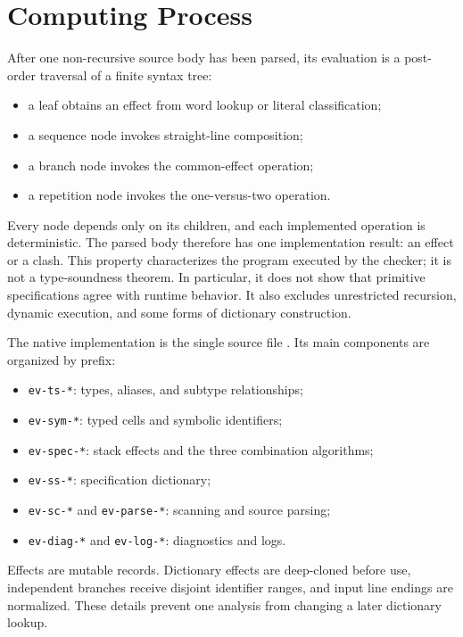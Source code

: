\documentclass[11pt,a4paper]{article}
\begin{document}
\section{Computing Process}
\label{sec:implementation}

After one non-recursive source body has been parsed, its evaluation is a
post-order traversal of a finite syntax tree:

\begin{itemize}
  \item a leaf obtains an effect from word lookup or literal classification;
  \item a sequence node invokes straight-line composition;
  \item a branch node invokes the common-effect operation;
  \item a repetition node invokes the one-versus-two operation.
\end{itemize}

Every node depends only on its children, and each implemented operation is
deterministic.  The parsed body therefore has one implementation result: an
effect or a clash.  This property characterizes the program executed by the
checker; it is not a type-soundness theorem.  In particular, it does not show
that primitive specifications agree with runtime behavior.  It also excludes
unrestricted recursion, dynamic execution, and some forms of dictionary
construction.

The native implementation is the single source file
.  Its main components are organized by prefix:

\begin{itemize}
  \item \texttt{ev-ts-*}: types, aliases, and subtype relationships;
  \item \texttt{ev-sym-*}: typed cells and symbolic identifiers;
  \item \texttt{ev-spec-*}: stack effects and the three combination algorithms;
  \item \texttt{ev-ss-*}: specification dictionary;
  \item \texttt{ev-sc-*} and \texttt{ev-parse-*}: scanning and source parsing;
  \item \texttt{ev-diag-*} and \texttt{ev-log-*}: diagnostics and logs.
\end{itemize}

Effects are mutable records.  Dictionary effects are deep-cloned before use,
independent branches receive disjoint identifier ranges, and input line
endings are normalized.  These details prevent one analysis from changing a
later dictionary lookup.
\end{document}
